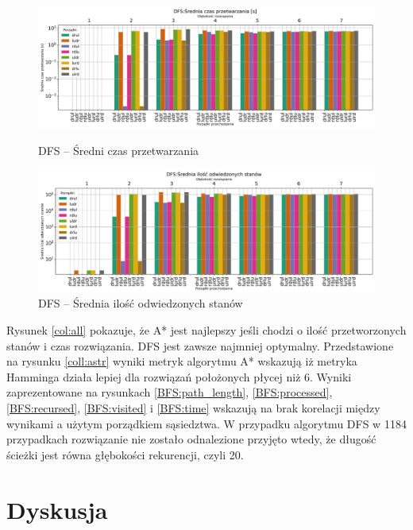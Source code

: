 \documentclass{classrep}
\begin{document}
\begin{figure}[H]
    \includegraphics[width=\textwidth]{charts/DFS_time.png}
    \caption{DFS -- Średni czas przetwarzania}
    \label{DFS:time}
    \includegraphics[width=\textwidth]{charts/DFS_visited.png}
    \caption{DFS -- Średnia ilość odwiedzonych stanów}
    \label{DFS:visited}
\end{figure}
\restoregeometry
Rysunek \ref{col:all} pokazuje, że A* jest najlepszy jeśli chodzi o ilość przetworzonych stanów i czas rozwiązania. DFS jest zawsze najmniej optymalny.
Przedstawione na rysunku \ref{coll:astr} wyniki metryk algorytmu A* wskazują iż metryka Hamminga działa lepiej dla rozwiązań położonych płycej niż 6.
Wyniki zaprezentowane na rysunkach \ref{BFS:path_length}, \ref{BFS:processed}, \ref{BFS:recursed}, \ref{BFS:visited} i \ref{BFS:time} wskazują na brak korelacji między wynikami a użytym porządkiem sąsiedztwa.
W przypadku algorytmu DFS w 1184 przypadkach rozwiązanie nie zostało odnalezione przyjęto wtedy, że długość ścieżki jest równa głębokości rekurencji, czyli 20.

\section{Dyskusja}
\end{document}
